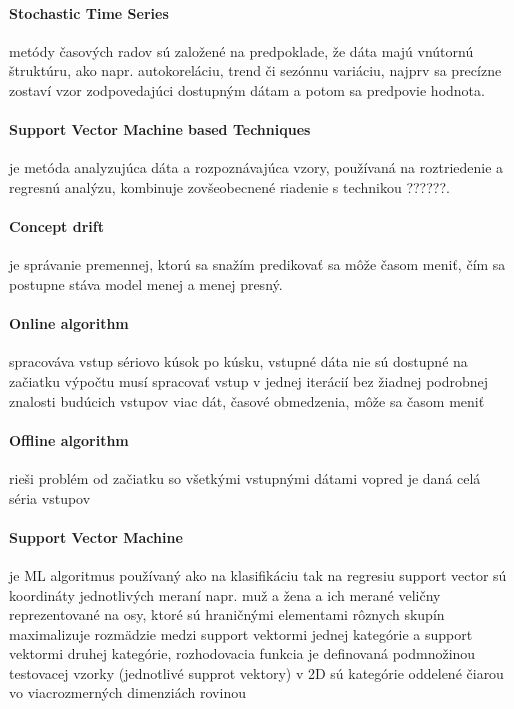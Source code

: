 \documentclass[12pt,oneside,slovak,a4paper]{book}
\begin{document}
\paragraph{Stochastic Time Series}
metódy časových radov sú založené na predpoklade, že dáta majú vnútornú
štruktúru, ako napr. autokoreláciu, trend či sezónnu variáciu, najprv sa
precízne zostaví vzor zodpovedajúci dostupným dátam a potom sa predpovie
hodnota\cite{KumarSingh2013}.

\paragraph{Support Vector Machine based Techniques}
je metóda analyzujúca dáta a rozpoznávajúca vzory, používaná na roztriedenie
a regresnú analýzu, kombinuje zovšeobecnené riadenie
s technikou ??????\cite{KumarSingh2013}.

\paragraph{Concept drift}
je správanie premennej, ktorú sa snažím predikovať sa môže časom meniť,
čím sa postupne stáva model menej a menej presný\cite{Grmanova2016}.

\paragraph{Online algorithm}
spracováva vstup sériovo kúsok po kúsku, vstupné dáta nie sú dostupné na začiatku výpočtu %
musí spracovať vstup v jednej iterácií bez žiadnej podrobnej znalosti budúcich vstupov %
viac dát, časové obmedzenia, môže sa časom meniť %

\paragraph{Offline algorithm}
rieši problém od začiatku so všetkými vstupnými dátami %
vopred je daná celá séria vstupov %

\paragraph{Support Vector Machine}
je ML algoritmus používaný ako na klasifikáciu tak na regresiu
support vector sú koordináty jednotlivých meraní napr. muž a žena a ich merané veličny reprezentované na osy, ktoré sú hraničnými elementami rôznych skupín
maximalizuje rozmädzie medzi support vektormi jednej kategórie a support vektormi druhej kategórie, rozhodovacia funkcia je definovaná podmnožinou testovacej vzorky (jednotlivé supprot vektory)
v 2D sú kategórie oddelené čiarou vo viacrozmerných dimenziách rovinou
\end{document}

